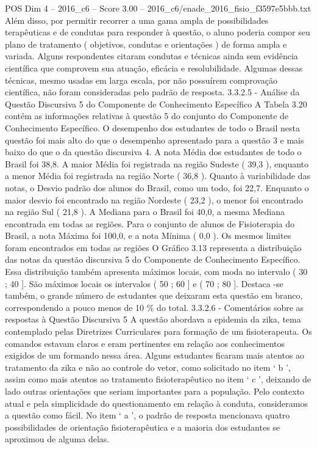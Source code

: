 \begin{textsample}{POS Dim 4 – 2016\_c6 – Score 3.00 – 2016\_c6/enade\_2016\_fisio\_f3597e5bbb.txt}
Além disso, por permitir recorrer a uma gama ampla de possibilidades terapêuticas e de condutas para responder à questão, o aluno poderia compor seu plano de tratamento ( objetivos, condutas e orientações ) de forma ampla e variada.
Alguns respondentes citaram condutas e técnicas ainda sem evidência científica que comprovem sua atuação, eficácia e resolubilidade.
Algumas dessas técnicas, mesmo usadas em larga escala, por não possuírem comprovação científica, não foram consideradas pelo padrão de resposta. 3.3.2.5 - Análise da Questão Discursiva 5 do Componente de Conhecimento Específico A Tabela 3.20 contém as informações relativas à questão 5 do conjunto do Componente de Conhecimento Específico.
O desempenho dos estudantes de todo o Brasil nesta questão foi mais alto do que o desempenho apresentado para a questão 3 e mais baixo do que o da questão discursiva 4.
A nota Média dos estudantes de todo o Brasil foi 38,8.
A maior Média foi registrada na região Sudeste ( 39,3 ), enquanto a menor Média foi registrada na região Norte ( 36,8 ).
Quanto à variabilidade das notas, o Desvio padrão dos alunos do Brasil, como um todo, foi 22,7.
Enquanto o maior desvio foi encontrado na região Nordeste ( 23,2 ), o menor foi encontrado na região Sul ( 21,8 ).
A Mediana para o Brasil foi 40,0, a mesma Mediana encontrada em todas as regiões.
Para o conjunto de alunos de Fisioterapia do Brasil, a nota Máxima foi 100,0, e a nota Mínima ( 0,0 ).
Os mesmos limites foram encontrados em todas as regiões O Gráfico 3.13 representa a distribuição das notas da questão discursiva 5 do Componente de Conhecimento Específico.
Essa distribuição também apresenta máximos locais, com moda no intervalo ( 30 ; 40 ].
São máximos locais os intervalos ( 50 ; 60 ] e ( 70 ; 80 ].
Destaca -se também, o grande número de estudantes que deixaram esta questão em branco, correspondendo a pouco menos de 10 \% do total. 3.3.2.6 - Comentários sobre as respostas à Questão Discursiva 5 A questão abordava a epidemia da zika, tema contemplado pelas Diretrizes Curriculares para formação de um fisioterapeuta.
Os comandos estavam claros e eram pertinentes em relação aos conhecimentos exigidos de um formando nessa área.
Alguns estudantes ficaram mais atentos ao tratamento da zika e não ao controle do vetor, como solicitado no item ‘ b ’, assim como mais atentos ao tratamento fisioterapêutico no item ‘ c ’, deixando de lado outras orientações que seriam importantes para a população.
Pelo contexto atual e pela simplicidade do questionamento em relação à conduta, consideramos a questão como fácil.
No item ‘ a ’, o padrão de resposta mencionava quatro possibilidades de orientação fisioterapêutica e a maioria dos estudantes se aproximou de alguma delas.

\end{textsample}

